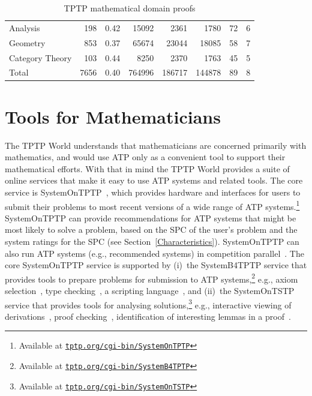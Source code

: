 \documentclass[runningheads]{llncs}
\begin{document}
\begin{table}[tb]
\begin{center}
\begin{tabular}{l|rr|rrrrr}
Analysis            &  198 & 0.42 &  15092 &  2361 &  1780 &   72 &     6 \\
Geometry            &  853 & 0.37 &  65674 & 23044 & 18085 &   58 &     7 \\
Category Theory     &  103 & 0.44 &   8250 &  2370 &  1763 &   45 &     5 \\
\hline
Total               & 7656 & 0.40 & 764996 &186717 &144878 &   89 &     8 \\
\end{tabular}
\end{center}
\caption{TPTP mathematical domain proofs}
\label{Proofs}
\end{table}

\section{Tools for Mathematicians}
\label{Tools}

The TPTP World understands that mathematicians are concerned primarily with mathematics, and would
use ATP only as a convenient tool to support their mathematical efforts.
With that in mind the TPTP World provides a suite of online services that make it easy to use ATP
systems and related tools.
The core service is SystemOnTPTP~\cite{Sut00-CADE-17}, which provides hardware and interfaces 
for users to submit their problems to most recent versions of a wide range of ATP 
systems.\footnote{%
Available at \href{https://tptp.org/cgi-bin/SystemOnTPTP}{{\tt tptp.org/cgi-bin/SystemOnTPTP}}}
SystemOnTPTP can provide recommendations for ATP systems that might be most likely to solve
a problem, based on the SPC of the user's problem and the system ratings for the SPC
(see Section~\ref{Characteristics}).
SystemOnTPTP can also run ATP systems (e.g., recommended systems) in competition
parallel~\cite{SS99-FLAIRS}.
The core SystemOnTPTP service is supported by (i)~the SystemB4TPTP service that provides tools to
prepare problems for submission to ATP systems,\footnote{%
Available at \href{https://tptp.org/cgi-bin/SystemB4TPTP}{{\tt tptp.org/cgi-bin/SystemB4TPTP}}}
e.g., axiom selection~\cite{HV11}, type checking~\cite{KSR16}, a scripting language~\cite{Sut14}, 
and (ii)~the SystemOnTSTP service that provides tools for analysing solutions,\footnote{%
Available at \href{https://tptp.org/cgi-bin/SystemOnTSTP}{{\tt tptp.org/cgi-bin/SystemOnTSTP}}} 
e.g., interactive viewing of derivations~\cite{TPS07}, proof checking~\cite{Sut06}, identification 
of interesting lemmas in a proof~\cite{PGS06}.
\end{document}
